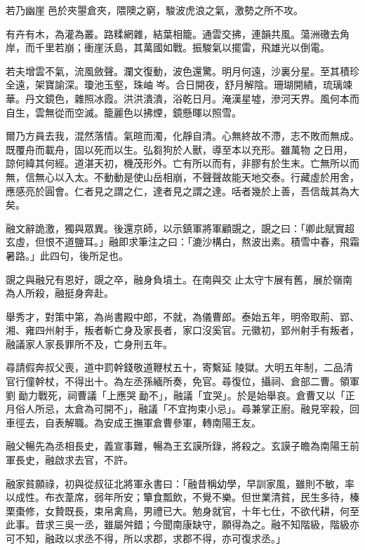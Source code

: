 \begin{pinyinscope}
 若乃幽崖邑於夾曌倉夾，隈隩之窮，駿波虎浪之氣，激勢之所不攻。



 有卉有木，為灌為叢。路糅網雜，結葉相籠。通雲交拂，連韻共風。蕩洲礉去角岸，而千里若崩；衝崖沃島，其萬國如戰。振駿氣以擺雷，飛雄光以倒電。



 若夫增雲不氣，流風斂聲。瀾文復動，波色還驚。明月何遠，沙裏分星。至其積珍全遠，架寶諭深。瓊池玉壑，珠岫岑。合日開夜，舒月解陰。珊瑚開繢，琉璃竦華。丹文鏡色，雜照冰霞。洪洪潰潰，浴乾日月。淹漢星墟，滲河天界。風何本而自生，雲無從而空滅。籠麗色以拂煙，鏡懸暉以照雪。



 爾乃方員去我，混然落情。氣暄而濁，化靜自清。心無終故不滯，志不敗而無成。既覆舟而載舟，固以死而以生。弘芻狗於人獸，導至本以充形。雖萬物
 之日用，諒何緯其何經。道湛天初，機茂形外。亡有所以而有，非膠有於生末。亡無所以而無，信無心以入太。不動動是使山岳相崩，不聲聲故能天地交泰。行藏虛於用舍，應感亮於圓會。仁者見之謂之仁，達者見之謂之達。咶者幾於上善，吾信哉其為大矣。



 融文辭詭激，獨與眾異。後還京師，以示鎮軍將軍顧覬之，覬之曰：「卿此賦實超玄虛，但恨不道鹽耳。」融即求筆注之曰：「漉沙構白，熬波出素。積雪中春，飛霜暑路。」此四句，後所足也。



 覬之與融兄有恩好，覬之卒，融身負墳土。在南與交止太守卞展有舊，展於嶺南為人所殺，融挺身奔赴。



 舉秀才，對策中第，為尚書殿中郎，不就，為儀曹郎。泰始五年，明帝取荊、郢、湘、雍四州射手，叛者斬亡身及家長者，家口沒奚官。元徽初，郢州射手有叛者，融議家人家長罪所不及，亡身刑五年。



 尋請假奔叔父喪，道中罰幹錢敬道鞭杖五十，寄繫延
 陵獄。大明五年制，二品清官行僮幹杖，不得出十。為左丞孫緬所奏，免官。尋復位，攝祠、倉部二曹。領軍劉勔力戰死，祠曹議「上應哭勔不」，融議「宜哭」。於是始舉哀。倉曹又以「正月俗人所忌，太倉為可開不」，融議「不宜拘束小忌」。尋兼掌正廚。融見宰殺，回車徑去，自表解職。為安成王撫軍倉曹參軍，轉南陽王友。



 融父暢先為丞相長史，義宣事難，暢為王玄謨所錄，將殺之。玄謨子瞻為南陽王前軍長史，融啟求去官，不許。



 融家貧願祿，初與從叔征北將軍永書曰：「融昔稱幼學，早訓家風，雖則不敏，率以成性。布衣葦席，弱年所安；簞食瓢飲，不覺不樂。但世業清貧，民生多待，榛栗棗修，女贄既長，束帛禽鳥，男禮已大。勉身就官，十年七仕，不欲代耕，何至此事。昔求三吳一丞，雖屬舛錯；今聞南康缺守，願得為之。融不知階級，階級亦可不知，融政以求丞不得，所以求郡，求郡不得，亦可復求丞。」




\end{pinyinscope}
